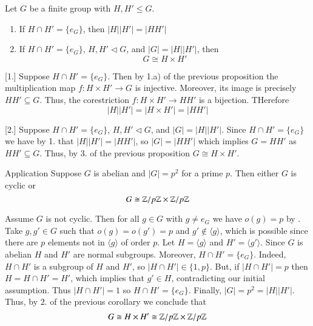 \documentclass[12pt, a4paper, twoside, openright, titlepage]{book}
\begin{document}
\begin{cor}{}{}
        Let $G$ be a finite group with $H,H' \leq G$. \begin{enumerate}
                \item If $H \cap H' = \{e_G\}$, then $|H||H'| = |HH'|$
                \item If $H \cap H' = \{e_G\}$, $H,H' \vartriangleleft G$, and $|G| = |H||H'|$, then \begin{equation}
                                G \cong H \times H'
                \end{equation}
        \end{enumerate}
\end{cor}
\begin{proof*}{}{}
        [1.] Suppose $H \cap H' = \{e_G\}$. Then by 1.a) of the previous proposition the multiplication map $f:H\times H' \rightarrow G$ is injective. Moreover, its image is precisely $HH' \subseteq G$. Thus, the corestriction $f:H\times H' \rightarrow HH'$ is a bijection. THerefore \begin{equation}
                |H||H'| = |H\times H'| = |HH'|
        \end{equation}

        [2.] Suppose $H \cap H' = \{e_G\}$, $H,H' \vartriangleleft G$, and $|G| = |H||H'|$. Since $H \cap H' = \{e_G\}$ we have by 1. that $|H||H'| = |HH'|$, so $|G| = |HH'|$ which implies $G = HH'$ as $HH' \subseteq G$. Thus, by 3. of the previous proposition $G \cong H \times H'$.
\end{proof*}


\begin{rmk}{Application}{}
        Suppose $G$ is abelian and $|G| = p^2$ for a prime $p$. Then either $G$ is cyclic or \begin{equation}
                G \cong \mathbb Z/p\mathbb Z\times \mathbb Z/p\mathbb Z
        \end{equation}
\end{rmk}
\begin{proof*}{}{}
        Assume $G$ is not cyclic. Then for all $g \in G$ with $g \neq e_G$ we have $o(g) = p$ by . Take $g,g' \in G$ such that $o(g) = o(g') = p$ and $g' \notin \langle g\rangle$, which is possible since there are $p$ elements not in $\langle g \rangle$ of order $p$. Let $H = \langle g \rangle$ and $H' = \langle g' \rangle$. Since $G$ is abelian $H$ and $H'$ are normal subgroups. Moreover, $H \cap H' = \{e_G\}$. Indeed, $H\cap H'$ is a subgroup of $H$ and $H'$, so $|H\cap H'| \in \{1,p\}$. But, if $|H\cap H'| = p$ then $H = H \cap H' = H'$, which implies that $g' \in H$, contradicting our initial assumption. Thus $|H \cap H'| = 1$ so $H\cap H' = \{e_G\}$. Finally, $|G| = p^2 = |H||H'|$. Thus, by 2. of the previous corollary we conclude that \begin{equation}
                G \cong H \times H' \cong \mathbb Z/p\mathbb Z \times \mathbb Z/p\mathbb Z
        \end{equation}
\end{proof*}
\end{document}
